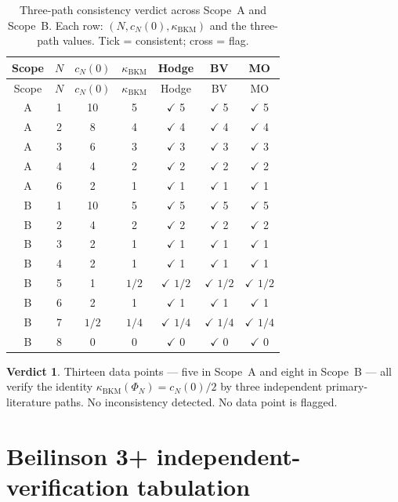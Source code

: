 \documentclass[11pt]{article}
\providecommand{\kBKM}{\kappa_{\mathrm{BKM}}}
\theoremstyle{definition}
\newtheorem*{verdict}{Verdict}
\begin{document}
\begin{longtable}{c|c|c|c|c|c|c}
\caption{Three-path consistency verdict across Scope~A and
Scope~B. Each row: $(N, c_N(0), \kBKM)$ and the three-path values.
Tick = consistent; cross = flag.}
\label{tab:three-path-verdict} \\
\hline
Scope & $N$ & $c_N(0)$ & $\kBKM$ &
Hodge & BV & MO \\
\hline
\endfirsthead
\hline
Scope & $N$ & $c_N(0)$ & $\kBKM$ &
Hodge & BV & MO \\
\hline
\endhead
A & 1 & 10 & 5 & $\checkmark$ 5 & $\checkmark$ 5 & $\checkmark$ 5 \\
A & 2 &  8 & 4 & $\checkmark$ 4 & $\checkmark$ 4 & $\checkmark$ 4 \\
A & 3 &  6 & 3 & $\checkmark$ 3 & $\checkmark$ 3 & $\checkmark$ 3 \\
A & 4 &  4 & 2 & $\checkmark$ 2 & $\checkmark$ 2 & $\checkmark$ 2 \\
A & 6 &  2 & 1 & $\checkmark$ 1 & $\checkmark$ 1 & $\checkmark$ 1 \\
\hline
B & 1 & 10    & 5      & $\checkmark$ 5     & $\checkmark$ 5     & $\checkmark$ 5 \\
B & 2 &  4    & 2      & $\checkmark$ 2     & $\checkmark$ 2     & $\checkmark$ 2 \\
B & 3 &  2    & 1      & $\checkmark$ 1     & $\checkmark$ 1     & $\checkmark$ 1 \\
B & 4 &  2    & 1      & $\checkmark$ 1     & $\checkmark$ 1     & $\checkmark$ 1 \\
B & 5 &  1    & $1/2$  & $\checkmark$ $1/2$ & $\checkmark$ $1/2$ & $\checkmark$ $1/2$ \\
B & 6 &  2    & 1      & $\checkmark$ 1     & $\checkmark$ 1     & $\checkmark$ 1 \\
B & 7 &  $1/2$ & $1/4$ & $\checkmark$ $1/4$ & $\checkmark$ $1/4$ & $\checkmark$ $1/4$ \\
B & 8 &  0    & 0      & $\checkmark$ 0     & $\checkmark$ 0     & $\checkmark$ 0 \\
\hline
\end{longtable}

\begin{verdict}
Thirteen data points --- five in Scope~A and eight in Scope~B --- all
verify the identity $\kBKM(\Phi_N) = c_N(0)/2$ by three independent
primary-literature paths. No inconsistency detected. No data point is
flagged.
\end{verdict}

\section{Beilinson 3+ independent-verification tabulation}
\label{sec:beilinson-3-plus}
\end{document}

